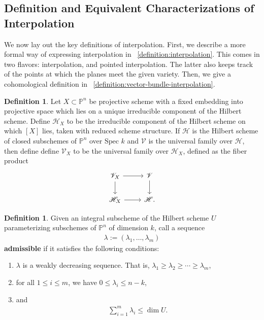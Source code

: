 \documentclass[reqno, 11pt]{amsart}
\theoremstyle{definition}
\theoremstyle{remark}
\numberwithin{equation}{section}
\numberwithin{thm}{section}
\numberwithin{prop}{section}
\numberwithin{lem}{section}
\numberwithin{cor}{section}
\numberwithin{conj}{section}
\numberwithin{defn}{section}
\theoremstyle{plain}
\theoremstyle{definition}
\newtheorem{definition}[theorem]{Definition}
\newcommand\ssec{\subsection}
\newcommand\bp{{\mathbb P}}
\newcommand\sch{\mathscr H}
\newcommand\scv{\mathscr V}
\newcommand \spec{\text{Spec }}
\newcommand \hilb[1]{\sch_{#1}}
\newcommand \uhilb[1]{\scv_{#1}}
\begin{document}
\ssec{Definition and Equivalent Characterizations of Interpolation}
We now lay out the key definitions of interpolation.
First, we describe a more formal way of expressing interpolation
in ~\autoref{definition:interpolation}.
This comes in two flavors: interpolation, and pointed interpolation.
The latter also keeps track of the points at which the planes
meet the given variety. Then, we give a cohomological
definition in ~\autoref{definition:vector-bundle-interpolation}.


\begin{definition}
	\label{definition:Hilbert-scheme-component}
	Let $X \subset \bp^n$ be projective scheme with a fixed embedding into projective space which lies on a unique irreducible component
	of the Hilbert scheme.
	Define $\hilb X$ to be the irreducible component of the Hilbert scheme on which $[X]$ lies, taken with reduced scheme structure.
	If $\sch$ is the Hilbert scheme of closed subschemes of $\bp^n$ over $\spec k$ and $\scv$
	is the universal family over $\sch$, then define
	define $\uhilb X$ to be the universal family over $\hilb X$, defined as the
	fiber product
	\begin{equation}
	\nonumber
		\nonumber
		\begin{tikzcd} 
		  \uhilb X \ar{r} \ar{d} & \scv \ar{d} \\
		  \hilb X \ar{r} & \sch.
		\end{tikzcd}\end{equation}
\end{definition}

\begin{definition}
	\label{definition:lambda-constraints}
	Given an integral subscheme of the Hilbert scheme $U$
	parameterizing subschemes of $\bp^n$ of dimension $k$,
	call a sequence
	\begin{align*}
	\lambda := \left( \lambda_1, \ldots, \lambda_m \right)
\end{align*}
{\bf admissible} if it satisfies the following conditions:
\begin{enumerate}
	\item $\lambda$ is a weakly decreasing sequence.
		That is, $\lambda_1 \geq \lambda_2 \geq \cdots \geq \lambda_m$,
	\item for all $1 \leq i \leq m$, we have $0 \leq \lambda_i \leq n - k$,
	\item and
\begin{align*}
	\sum_{i=1}^m \lambda_i \leq \dim U.
\end{align*}
\end{enumerate}
\end{definition}
\end{document}
